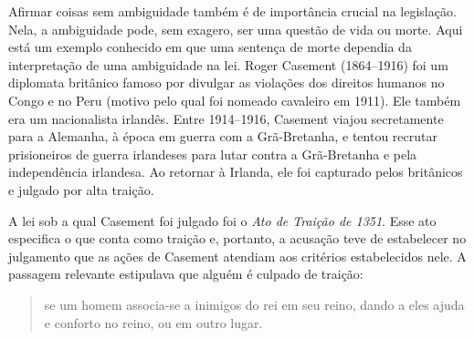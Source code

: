 Afirmar coisas sem ambiguidade também é de importância crucial na legislação. Nela, a ambiguidade pode, sem exagero, ser uma questão de vida ou morte. Aqui está um exemplo conhecido em que uma sentença de morte dependia da interpretação de uma ambiguidade na lei. Roger Casement (1864--1916) foi um diplomata britânico famoso por divulgar as violações dos direitos humanos no Congo e no Peru (motivo pelo qual foi nomeado cavaleiro em 1911). Ele também era um nacionalista irlandês. Entre 1914--1916, Casement viajou secretamente para a Alemanha, à época em guerra com a Grã-Bretanha, e tentou recrutar prisioneiros de guerra irlandeses para lutar contra a Grã-Bretanha e pela independência irlandesa. Ao retornar à Irlanda, ele foi capturado pelos britânicos e julgado por alta traição.

A lei sob a qual Casement foi julgado foi o \emph{Ato de Traição de 1351}. Esse ato especifica o que conta como traição e, portanto, a acusação teve de estabelecer no julgamento que as ações de Casement atendiam aos critérios estabelecidos nele. A passagem relevante estipulava que alguém é culpado de traição:
\begin{quote}
	se um homem associa-se a inimigos do rei em seu
reino, dando a eles ajuda e conforto no reino, ou em outro lugar.
\end{quote} 


